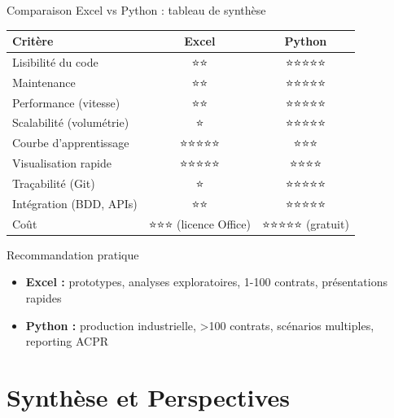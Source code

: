 \documentclass[10pt,aspectratio=169]{beamer}
\begin{document}
\begin{frame}{Comparaison Excel vs Python : tableau de synthèse}
\begin{table}
\centering
\small
\begin{tabular}{l|c|c}
\toprule
\textbf{Critère} & \textbf{Excel} & \textbf{Python} \\
\midrule
\rowcolor{bleuactu!10}
Lisibilité du code & ⭐⭐ & ⭐⭐⭐⭐⭐ \\
Maintenance & ⭐⭐ & ⭐⭐⭐⭐⭐ \\
\rowcolor{bleuactu!10}
Performance (vitesse) & ⭐⭐ & ⭐⭐⭐⭐⭐ \\
Scalabilité (volumétrie) & ⭐ & ⭐⭐⭐⭐⭐ \\
\rowcolor{bleuactu!10}
Courbe d'apprentissage & ⭐⭐⭐⭐⭐ & ⭐⭐⭐ \\
Visualisation rapide & ⭐⭐⭐⭐⭐ & ⭐⭐⭐⭐ \\
\rowcolor{bleuactu!10}
Traçabilité (Git) & ⭐ & ⭐⭐⭐⭐⭐ \\
Intégration (BDD, APIs) & ⭐⭐ & ⭐⭐⭐⭐⭐ \\
\rowcolor{bleuactu!10}
Coût & ⭐⭐⭐ (licence Office) & ⭐⭐⭐⭐⭐ (gratuit) \\
\bottomrule
\end{tabular}
\end{table}

\vspace{0.3cm}
\begin{block}{Recommandation pratique}
\begin{itemize}
    \item \textbf{Excel :} prototypes, analyses exploratoires, 1-100 contrats, présentations rapides
    \item \textbf{Python :} production industrielle, >100 contrats, scénarios multiples, reporting ACPR
\end{itemize}
\end{block}
\end{frame}

\section{Synthèse et Perspectives}
\end{document}
